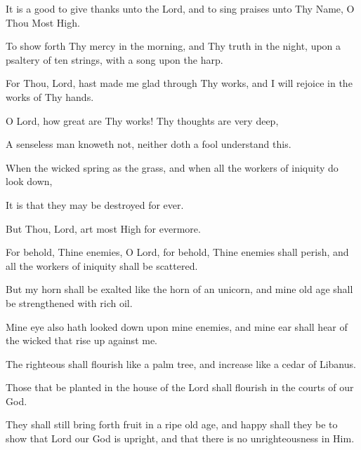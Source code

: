 It is a good to give thanks unto the Lord, and to sing praises unto Thy Name, O Thou Most High.

To show forth Thy mercy in the morning, and Thy truth in the night, upon a psaltery of ten strings, with a song upon the harp.

For Thou, Lord, hast made me glad through Thy works, and I will rejoice in the works of Thy hands.

O Lord, how great are Thy works! Thy thoughts are very deep,

A senseless man knoweth not, neither doth a fool understand this.

When the wicked spring as the grass, and when all the workers of iniquity do look down,

It is that they may be destroyed for ever.

But Thou, Lord, art most High for evermore.

For behold, Thine enemies, O Lord, for behold, Thine enemies shall perish, and all the workers of iniquity shall be scattered.

But my horn shall be exalted like the horn of an unicorn, and mine old age shall be strengthened with rich oil.

Mine eye also hath looked down upon mine enemies, and mine ear shall hear of the wicked that rise up against me.

The righteous shall flourish like a palm tree, and increase like a cedar of Libanus.

Those that be planted in the house of the Lord shall flourish in the courts of our God.

They shall still bring forth fruit in a ripe old age, and happy shall they be to show that Lord our God is upright, and that there is no unrighteousness in Him.
